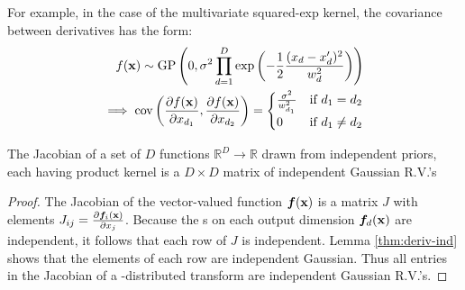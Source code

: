 For example, in the case of the multivariate squared-exp kernel, the covariance between derivatives has the form:
%
\begin{align}
f({\bf{x}}) \sim \textnormal{GP}\left( 0, 
\sigma^2 \prod_{d=1}^D \exp \left(-\frac{1}{2} \frac{(x_d - x_d')^2}{w_d^2} \right) \right) \nonumber \\
 \implies 
\operatorname{cov} \left( \frac{\partial f({\bf{x}})}{\partial x_{d_1}}, \frac{\partial f({\bf{x}})}{\partial x_{d_2}} \right) =
\begin{cases} 
\frac{\sigma^2}{w_{d_1}^2} & \mbox{if } d_1 = d_2 \\ 
0 & \mbox{if } d_1 \neq d_2 \end{cases}
\end{align}


\begin{lemma}
\label{thm:matrix}
The Jacobian of a set of $D$ functions $\mathbb{R}^D \rightarrow \mathbb{R}$ drawn from independent \gp{} priors, each having product kernel is a $D \times D$ matrix of independent Gaussian R.V.'s
\end{lemma}
%
\begin{proof}
The Jacobian of the vector-valued function $\boldsymbol{f}({\bf{x}})$ is a matrix $J$ with elements ${J_{ij} = \frac{ \partial \boldsymbol{f}_i ({\bf{x}}) }{\partial x_j}}$.
%
%
%
Because the \gp{}s on each output dimension $\boldsymbol{f}_d({\bf{x}})$ are independent, it follows that each row of $J$ is independent.
Lemma \ref{thm:deriv-ind} shows that the elements of each row are independent Gaussian.
Thus all entries in the Jacobian of a \gp{}-distributed transform are independent Gaussian R.V.'s.
\end{proof}



